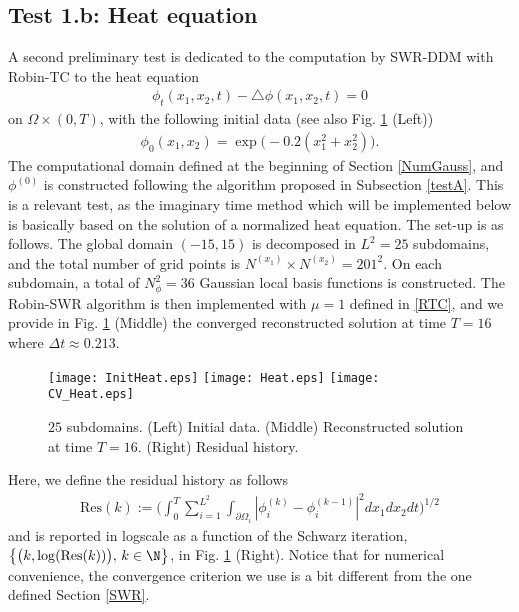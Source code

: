 \subsection{Test 1.b: Heat equation}
A second preliminary test is dedicated to the computation by SWR-DDM with Robin-TC to the heat equation
\begin{eqnarray*}
\phi_t(x_1,x_2,t) -\triangle \phi(x_1,x_2,t)=0
\end{eqnarray*}
on $\Omega\times (0,T)$,  with the following initial data (see also Fig. \ref{Heat1} (Left))
\begin{eqnarray*}
\phi_0(x_1,x_2) = \exp\big(-0.2(x_1^2+x_2^2)\big).
\end{eqnarray*} 
The computational domain defined at the beginning of Section \ref{NumGauss}, and $\phi^{(0)}$ is constructed following the algorithm proposed in Subsection \ref{testA}. This is a relevant test, as the imaginary time method which will be implemented below is basically based on the solution of a normalized heat equation. The set-up is as follows. The global domain $(-15,15)$ is decomposed in $L^2=25$ subdomains, and the total number of grid points is $N^{(x_1)}\times N^{(x_2)}=201^2$. On each subdomain, a total of $N_{\phi}^2=36$ Gaussian local basis functions is constructed. The Robin-SWR algorithm is then implemented with $\mu=1$ defined in \eqref{RTC}, and we provide in Fig. \ref{Heat1} (Middle) the converged reconstructed solution at time $T=16$ where $\Delta t \approx 0.213$.
\begin{figure}[!ht]
\begin{center}
\hspace*{1mm}\texttt{[image: InitHeat.eps]}
\hspace*{1mm}\texttt{[image: Heat.eps]}
\hspace*{1mm}\texttt{[image: CV\_Heat.eps]}
\caption{$25$ subdomains. (Left) Initial data. (Middle) Reconstructed solution at time $T=16$. (Right) Residual history.}
\label{Heat1}
\end{center}
\end{figure}
Here, we define the residual history as follows
\begin{eqnarray}\label{residueRT}
\textrm{Res}(k):=\Big(\int_0^{T}\sum_{i=1}^{L^2}\int_{\partial \Omega_i}|\phi_i^{(k)}-\phi_i^{(k-1)}|^2dx_1dx_2dt\Big)^{1/2}
\end{eqnarray}
and is reported in logscale as a function of the Schwarz iteration, $\big\{\big(k,\log(\textrm{Res}(k))\big), \, k \in \N\big\}$, in Fig. \ref{Heat1} (Right). Notice that for numerical convenience, the convergence criterion we use is a bit different from the one defined Section \ref{SWR}.

